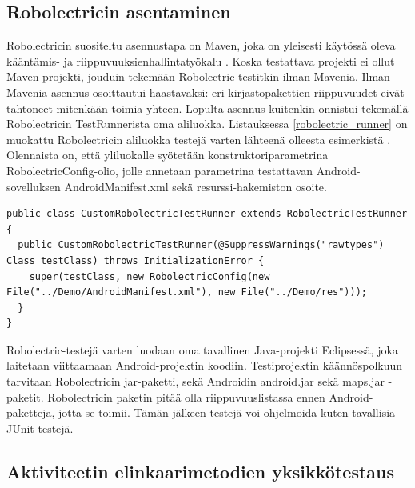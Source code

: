 \subsection{Robolectricin asentaminen}
\label{robolectric_install}

Robolectricin suositeltu asennustapa on Maven, joka on yleisesti käytössä oleva kääntämis- ja riippuvuuksienhallintatyökalu \cite{maven}. Koska testattava projekti ei ollut Maven-projekti, jouduin tekemään Robolectric-testitkin ilman Mavenia. Ilman Mavenia asennus osoittautui haastavaksi: eri kirjastopakettien riippuvuudet eivät tahtoneet mitenkään toimia yhteen. Lopulta asennus kuitenkin onnistui tekemällä Robolectricin TestRunnerista oma aliluokka. Listauksessa \ref{robolectric_runner} on muokattu Robolectricin aliluokka testejä varten lähteenä olleesta esimerkistä \cite{sample_runner}. Olennaista on, että yliluokalle syötetään konstruktoriparametrina RobolectricConfig-olio, jolle annetaan parametrina testattavan Android-sovelluksen AndroidManifest.xml sekä resurssi-hakemiston osoite.

\begin{lstlisting}[float,label=robolectric_runner,caption=CustomRobolectricTestRunner]
public class CustomRobolectricTestRunner extends RobolectricTestRunner {
  public CustomRobolectricTestRunner(@SuppressWarnings("rawtypes") Class testClass) throws InitializationError {
  	super(testClass, new RobolectricConfig(new File("../Demo/AndroidManifest.xml"), new File("../Demo/res")));
  }
}
\end{lstlisting}

Robolectric-testejä varten luodaan oma tavallinen Java-projekti Eclipsessä, joka laitetaan viittaamaan Android-projektin koodiin. Testiprojektin käännöspolkuun tarvitaan Robolectricin jar-paketti, sekä Androidin android.jar sekä maps.jar -paketit. Robolectricin paketin pitää olla riippuvuuslistassa ennen Android-paketteja, jotta se toimii. Tämän jälkeen testejä voi ohjelmoida kuten tavallisia JUnit-testejä.

\subsection{Aktiviteetin elinkaarimetodien yksikkötestaus}
\label{basic_unittests} 

